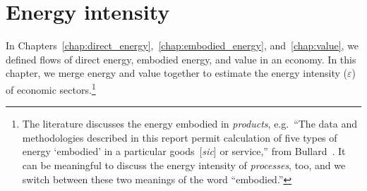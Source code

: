 %
%
%

\chapter{Energy intensity}
\label{chap:intensity} 





In Chapters~\ref{chap:direct_energy},~\ref{chap:embodied_energy}, and~\ref{chap:value}, 
we defined flows of direct energy, embodied energy, and value in an economy.
In this chapter, we merge energy and value together to estimate
the energy intensity ($\varepsilon$) of economic sectors.\footnote{The literature discusses 
the energy embodied in \emph{products}, e.g.\ ``The data and methodologies described in this report 
permit calculation of five types of energy `embodied' 
in a particular goods~[\emph{sic}] or service,'' %
from Bullard~\cite[p.~268]{Bullard:1978vd}. 
It can be meaningful to discuss the energy intensity of \emph{processes}, too,
and we switch between these two meanings of the word ``embodied.''}


